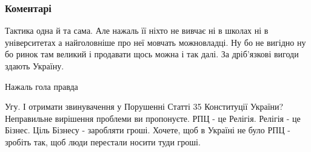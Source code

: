  
 
 
 
 
\subsubsection{Коментарі}

\begin{itemize}
 

Тактика одна й та сама. Але нажаль її ніхто не вивчає ні в школах ні в
університетах а найголовніше про неї мовчать можновладці. Ну бо не вигідно ну
бо ринок там великий і продавати щось можна і так далі. За дріб’язкові вигоди
здають Україну.


 
Нажаль гола правда

 

Угу. І отримати звинувачення у Порушенні Статті 35 Конституції України?
Неправильне вирішення проблеми ви пропонуєте. РПЦ - це Релігія. Релігія - це
Бізнес. Ціль Бізнесу - заробляти гроші. Хочете, щоб в Україні не було РПЦ -
зробіть так, щоб люди перестали носити туди гроші.

\begin{itemize}
 

\end{itemize}
\end{itemize}
